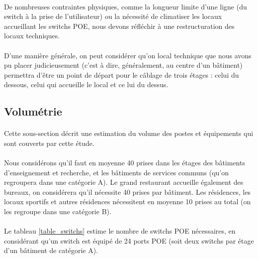 \paragraph{} De nombreuses contraintes physiques, comme la longueur limite d'une
ligne (du switch à la prise de l'utilisateur) ou la nécessité de climatiser les
locaux accueillant les switchs \ac{POE}, nous devons réfléchir à une
restructuration des locaux techniques.

\paragraph{} D'une manière générale, on peut considérer qu'on local technique
que nous avons pu placer judicieusement (c'est à dire, généralement, au centre
d'un bâtiment) permettra d'être un point de départ pour le câblage de trois
étages : celui du dessous, celui qui accueille le local et ce lui du dessus.

\subsection{Volumétrie}

\paragraph{} Cette sous-section décrit une estimation du volume des postes et
équipements qui sont couverts par cette étude.

\paragraph{} Nous considérons qu'il faut en moyenne 40 prises dans les étages
des bâtiments d'enseignement et recherche, et les bâtiments de services communs
(qu'on regroupera dans une catégorie A).
Le grand restaurant accueille également des bureaux, on considérera
qu'il nécessite 40 prises par bâtiment. Les résidences, les locaux sportifs et
autres résidences nécessitent en moyenne 10 prises au total (on les regroupe
    dans une catégorie B).

\paragraph{} Le tableau \ref{table_switchs} estime le nombre de switchs \ac{POE}
nécessaires, en considérant qu'un switch est équipé de 24 ports \ac{POE} (soit
deux switchs par étage d'un bâtiment de catégorie A).

